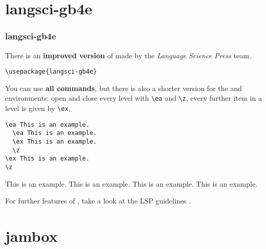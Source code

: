 \section{langsci-gb4e}

\begin{frame}[fragile]
\frametitle{langsci-gb4e}

There is an \textbf{improved version} of  made by the \emph{Language Science Press} team.

\begin{lstlisting}
\usepackage{langsci-gb4e}
\end{lstlisting}

You can use \textbf{all  commands}, but there is also a shorter version for the  and  environments: open and close every level with \lstinline|\ea| and \lstinline|\z|, every further item in a level is given by \lstinline|\ex|. 

\begin{multicols}{2}
	
\begin{lstlisting}
\ea This is an example. 
  \ea This is an example.
  \ex This is an example. 
  \z		
\ex This is an example.
\z 
\end{lstlisting}

\ea This is an example. 
\ea This is an example.
\ex This is an example. 
\z		
\ex This is an example.
\z 

\end{multicols}

For further features of , take a look at the LSP guidelines \citep{Nordhoff&Co}.


\end{frame}


\section{jambox}

